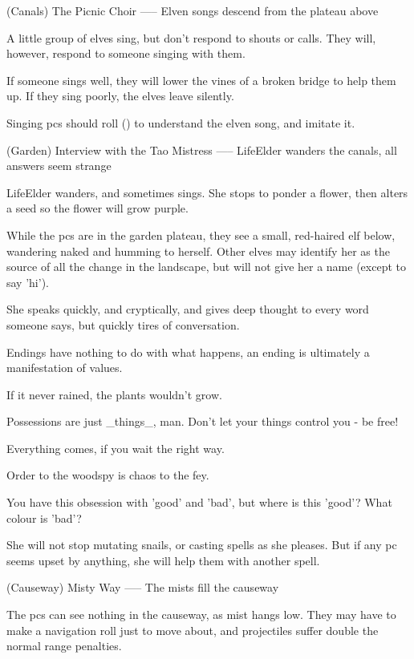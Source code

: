 (Canals) The Picnic Choir
-----
{Elven songs descend from the plateau above}

A little group of elves sing, but don't respond to shouts or calls.
They will, however, respond to someone singing with them.

If someone sings well, they will lower the vines of a broken bridge to help them up.
If they sing poorly, the elves leave silently.

Singing \glspl{pc} should roll  (\tn[10]) to understand the elven song, and imitate it.

(Garden) Interview with the Tao Mistress
-----
{LifeElder wanders the canals, all answers seem strange}

LifeElder wanders, and sometimes sings.
She stops to ponder a flower, then alters a seed so the flower will grow purple.

While the \glspl{pc} are in the garden plateau, they see a small, red-haired elf below, wandering naked and humming to herself.
Other elves may identify her as the source of all the change in the landscape, but will not give her a name (except to say 'hi').

She speaks quickly, and cryptically, and gives deep thought to every word someone says, but quickly tires of conversation.


\begin{speechtext}
  Endings have nothing to do with what happens, an ending is ultimately a manifestation of values.

  If it never rained, the plants wouldn't grow.

  Possessions are just _things_, man.  Don't let your things control you - be free!

  Everything comes, if you wait the right way.

  Order to the woodspy is chaos to the fey.

  You have this obsession with 'good' and 'bad', but where is this 'good'? What colour is 'bad'?

\end{speechtext}

She will not stop mutating snails, or casting spells as she pleases.
But if any \gls{pc} seems upset by anything, she will help them with another spell.

(Causeway) Misty Way
-----
{The mists fill the causeway}

The \glspl{pc} can see nothing in the causeway, as mist hangs low.
They may have to make a navigation roll just to move about, and projectiles suffer double the normal range penalties.

